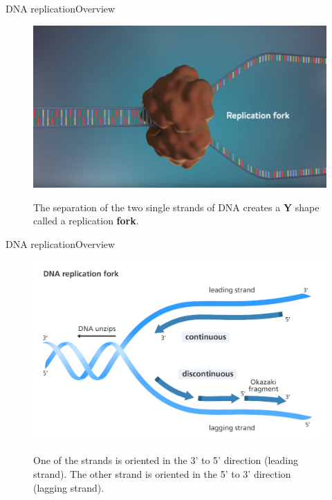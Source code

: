 \documentclass[10pt]{beamer}
\begin{document}
{%
\begin{frame}{DNA replication}{Overview}
	\begin{figure}[]
		\centering
		\includegraphics[width=\textwidth,height=0.6\textheight,keepaspectratio]{img/introduction/dna31.jpg}
		\label{img:mot2}
		\caption{The separation of the two single strands of DNA creates a \textbf{Y} shape called a replication \textbf{fork}.}
	\end{figure}
\end{frame}

\begin{frame}{DNA replication}{Overview}
	\begin{figure}[]
		\centering
		\includegraphics[width=\textwidth,height=0.6\textheight,keepaspectratio]{img/introduction/dna32.png}
		\label{img:mot2}
		\caption{One of the strands is oriented in the 3’ to 5’ direction (leading strand). The other strand is oriented in the 5’ to 3’ direction (lagging strand).}
	\end{figure}
\end{frame}

}
\end{document}
